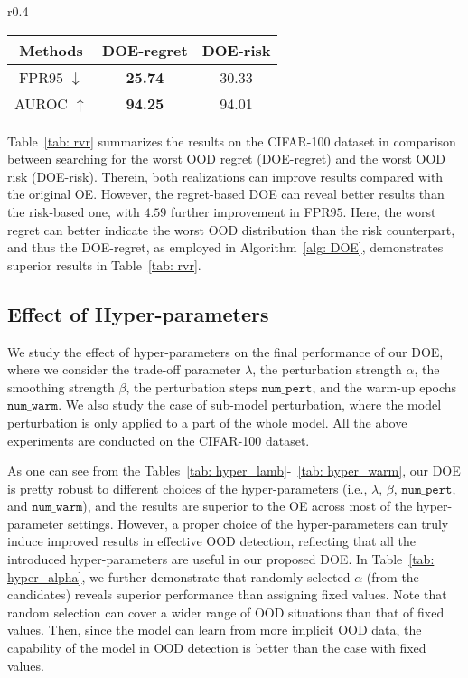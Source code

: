 \documentclass{article} \usepackage{iclr2022_conference,times}
\begin{document}
\begin{wraptable}{r}{0.4\textwidth}
\caption{Roubst learning with worst OOD regret and worst OOD risk.} \label{tab: rvr}
\centering
\small
\begin{tabular}{c|cc}
\toprule[1.5pt]
 Methods           & DOE-regret    & DOE-risk  \\
 \midrule[1pt]
FPR$95$ $\downarrow$ & \textbf{25.74}         & 30.33     \\
AUROC $\uparrow$   & \textbf{94.25}         & 94.01     \\
\bottomrule[1.5pt]
\end{tabular}
\end{wraptable}

Table~\ref{tab: rvr} summarizes the results on the CIFAR-100 dataset in comparison between searching for the worst OOD regret (DOE-regret) and the worst OOD risk (DOE-risk). Therein, both realizations can improve results compared with the original OE. However, the regret-based DOE can reveal better results than the risk-based one, with $4.59$ further improvement in FPR$95$. Here, the worst regret can better indicate the worst OOD distribution than the risk counterpart, and thus the DOE-regret, as employed in Algorithm~\ref{alg: DOE}, demonstrates superior results in Table~\ref{tab: rvr}.



\subsection{Effect of Hyper-parameters} 

We study the effect of hyper-parameters on the final performance of our DOE, where we consider the trade-off parameter $\lambda$, the perturbation strength $\alpha$, the smoothing strength $\beta$, the perturbation steps $\texttt{num\_pert}$, and the warm-up epochs $\texttt{num\_warm}$. We also study the case of sub-model perturbation, where the model perturbation is only applied to a part of the whole model. All the above experiments are conducted on the CIFAR-100 dataset.

As one can see from the Tables~\ref{tab: hyper_lamb}-~\ref{tab: hyper_warm}, our DOE is pretty robust to different choices of the hyper-parameters (i.e., $\lambda$, $\beta$, $\texttt{num\_pert}$, and $\texttt{num\_warm}$), and the results are superior to the OE across most of the hyper-parameter settings. However, a proper choice of the hyper-parameters can truly induce improved results in effective OOD detection, reflecting that all the introduced hyper-parameters are useful in our proposed DOE. In Table~\ref{tab: hyper_alpha}, we further demonstrate that randomly selected $\alpha$ (from the candidates) reveals superior performance than assigning fixed values. Note that random selection can cover a wider range of OOD situations than that of fixed values. Then, since the model can learn from more implicit OOD data, the capability of the model in OOD detection is better than the case with fixed values. 
\end{document}
